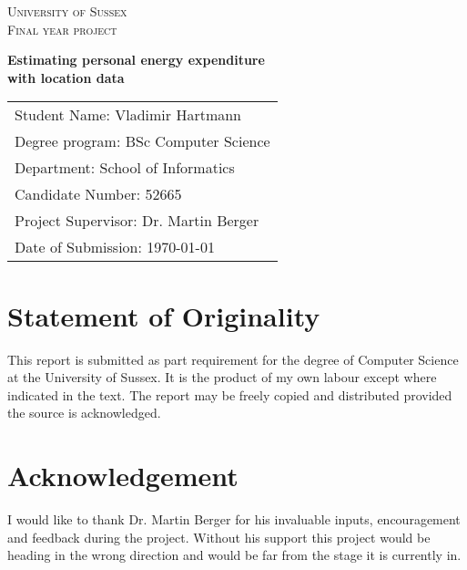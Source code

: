\documentclass[12pt, a4paper]{report}   %
\begin{document}
\makeatletter
\def\url@leostyle{%
  \@ifundefined{selectfont}{\def\UrlFont{\sf}}{\def\UrlFont{\small\ttfamily}}}
\makeatother



\begin{center}

\textsc{\large University of Sussex}\\[1.5cm]
\textsc{Final year project}\\[2cm]

\begin{spacing}{2.5}
{\Large \bfseries Estimating personal energy expenditure \\ with location data}\\[5 cm]
\end{spacing}
\end{center}
\vfill


\begin{spacing}{1.5}
\begin{tabular}{l}
Student Name: Vladimir Hartmann \\
Degree program: BSc Computer Science \\
Department: School of Informatics \\
Candidate Number: 52665 \\
Project Supervisor: Dr. Martin Berger \\
Date of Submission: {\today}
\end{tabular}
\end{spacing}
\thispagestyle{empty}


\clearpage
{}
\section*{Statement of Originality}
This report is submitted as part requirement for the degree of Computer Science at the University of Sussex. It is the product of my own labour except where indicated in the text. The report may be freely copied and distributed provided the source is acknowledged.


\clearpage
\section*{Acknowledgement}
I would like to thank Dr. Martin Berger for his invaluable inputs, encouragement and feedback during the project. Without his support this project would be heading in the wrong direction and would be far from the stage it is currently in.
\end{document}
